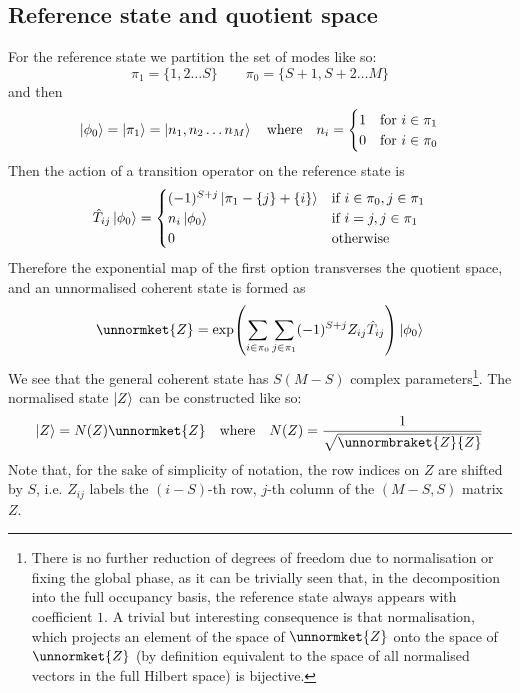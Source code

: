 \documentclass[12pt]{article}
\begin{document}
	
	\subsection{Reference state and quotient space}
	For the reference state we partition the set of modes like so:
	\begin{equation}
	\pi_1=\{1,2\dots S\}\qquad\pi_0=\{S+1, S+2\dots M\}
	\end{equation}
	and then
	\begin{equation}\label{eq:reference state definition}
	\ket{\phi_0}=\ket{\pi_1}=\ket{n_1, n_2\dots n_M}\qq{where}n_i=\begin{cases} 1 & \text{for }i\in\pi_1\\ 0 & \text{for } i\in\pi_0 \end{cases}
	\end{equation}
	Then the action of a transition operator on the reference state is
	\begin{equation}
	\hat{T}_{ij}\ket{\phi_0}=\begin{cases}
		(-1)^{S+j}\ket{\pi_1-\{j\}+\{i\}} & \text{if } i\in\pi_0, j\in\pi_1\\
		n_i\ket{\phi_0} & \text{if } i = j, j\in\pi_1\\
		0 & \text{otherwise}
	\end{cases}
	\end{equation}
	Therefore the exponential map of the first option transverses the quotient space, and an unnormalised coherent state is formed as
	\begin{equation}\label{eq:exponential ket}
	\unnormket{Z}=\exp(\sum_{i\in\pi_0}\sum_{j\in\pi_1}(-1)^{S+j}Z_{ij}\hat{T}_{ij})\ket{\phi_0}
	\end{equation}
	We see that the general coherent state has $S(M-S)$ complex parameters\footnote{There is no further reduction of degrees of freedom due to normalisation or fixing the global phase, as it can be trivially seen that, in the decomposition into the full occupancy basis, the reference state always appears with coefficient $1$. A trivial but interesting consequence is that normalisation, which projects an element of the space of $\unnormket{Z}$ onto the space of $\unnormket{Z}$ (by definition equivalent to the space of all normalised vectors in the full Hilbert space) is bijective.}. The normalised state $\ket{Z}$ can be constructed like so:
	\begin{equation}
	\ket{Z} = N(Z)\unnormket{Z}\qq{where}N(Z)=\frac{1}{\sqrt{\unnormbraket{Z}{Z}}}
	\end{equation}
	Note that, for the sake of simplicity of notation, the row indices on $Z$ are shifted by $S$, i.e. $Z_{ij}$ labels the $(i-S)$-th row, $j$-th column of the $(M-S,S)$ matrix $Z$.
	
\end{document}
